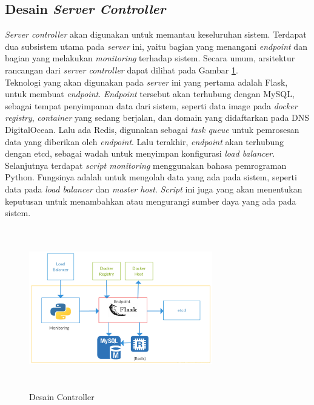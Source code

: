 		\subsection{Desain \textit{Server Controller}}
        	\textit{Server controller} akan digunakan untuk memantau keseluruhan sistem. Terdapat dua subsistem utama pada \textit{server} ini, yaitu bagian yang menangani \textit{endpoint} dan bagian yang melakukan \textit{monitoring} terhadap sistem. Secara umum, arsitektur rancangan dari \textit{server controller} dapat dilihat pada Gambar \ref{Controller}. \\
            \indent Teknologi yang akan digunakan pada \textit{server} ini yang pertama adalah Flask, untuk membuat \textit{endpoint}. \textit{Endpoint} tersebut akan terhubung dengan MySQL, sebagai tempat penyimpanan data dari sistem, seperti data image pada \textit{docker registry}, \textit{container} yang sedang berjalan, dan domain yang didaftarkan pada DNS DigitalOcean. Lalu ada Redis, digunakan sebagai \textit{task queue} untuk pemrosesan data yang diberikan oleh \textit{endpoint}. Lalu terakhir, \textit{endpoint} akan terhubung dengan etcd, sebagai wadah untuk menyimpan konfigurasi \textit{load balancer}. \\
            \indent Selanjutnya terdapat \textit{script monitoring} menggunakan bahasa pemrograman Python. Fungsinya adalah untuk mengolah data yang ada pada sistem, seperti data pada \textit{load balancer} dan \textit{master host}. \textit{Script} ini juga yang akan menentukan keputusan untuk menambahkan atau mengurangi sumber daya yang ada pada sistem.
        	\begin{figure}[H]
				\centering
				\includegraphics[width=8cm,height=7cm]{Images/C-3/controller.png}
				\caption{Desain Controller}
				\label{Controller}
			\end{figure}
            
